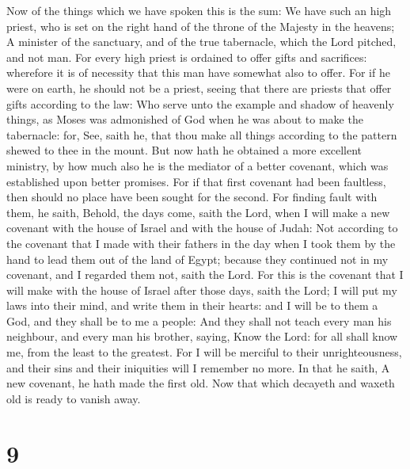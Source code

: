  Now of the things which we have spoken this is the sum: We
have such an high priest, who is set on the right hand of the throne of
the Majesty in the heavens;  A minister of the sanctuary,
and of the true tabernacle, which the Lord pitched, and not man.
 For every high priest is ordained to offer gifts and
sacrifices: wherefore it is of necessity that this man have somewhat
also to offer.  For if he were on earth, he should not be a
priest, seeing that there are priests that offer gifts according to the
law:  Who serve unto the example and shadow of heavenly
things, as Moses was admonished of God when he was about to make the
tabernacle: for, See, saith he, that thou make all things according to
the pattern shewed to thee in the mount.  But now hath he
obtained a more excellent ministry, by how much also he is the mediator
of a better covenant, which was established upon better promises.
 For if that first covenant had been faultless, then should
no place have been sought for the second.  For finding fault
with them, he saith, Behold, the days come, saith the Lord, when I will
make a new covenant with the house of Israel and with the house of
Judah:  Not according to the covenant that I made with their
fathers in the day when I took them by the hand to lead them out of the
land of Egypt; because they continued not in my covenant, and I regarded
them not, saith the Lord.  For this is the covenant that I
will make with the house of Israel after those days, saith the Lord; I
will put my laws into their mind, and write them in their hearts: and I
will be to them a God, and they shall be to me a people: 
And they shall not teach every man his neighbour, and every man his
brother, saying, Know the Lord: for all shall know me, from the least to
the greatest.  For I will be merciful to their
unrighteousness, and their sins and their iniquities will I remember no
more.  In that he saith, A new covenant, he hath made the
first old. Now that which decayeth and waxeth old is ready to vanish
away.

\hypertarget{section-8}{%
\section{9}\label{section-8}}

